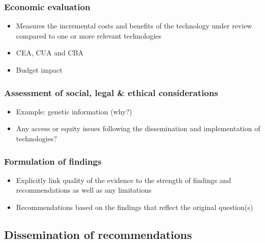 \documentclass[
]{book}
\providecommand{\tightlist}{%
  \setlength{\itemsep}{0pt}\setlength{\parskip}{0pt}}
\begin{document}
\hypertarget{economic-evaluation}{%
\subsubsection{Economic evaluation}\label{economic-evaluation}}

\begin{itemize}
\tightlist
\item
  Measures the incremental costs and benefits of the technology under review compared to one or more relevant technologies
\item
  CEA, CUA and CBA
\item
  Budget impact
\end{itemize}

\hypertarget{assessment-of-social-legal-ethical-considerations}{%
\subsubsection{Assessment of social, legal \& ethical considerations}\label{assessment-of-social-legal-ethical-considerations}}

\begin{itemize}
\tightlist
\item
  Example: genetic information (why?)
\item
  Any access or equity issues following the dissemination and implementation of technologies?
\end{itemize}

\hypertarget{formulation-of-findings}{%
\subsubsection{Formulation of findings}\label{formulation-of-findings}}

\begin{itemize}
\tightlist
\item
  Explicitly link quality of the evidence to the strength of findings and recommendations as well as any limitations
\item
  Recommendations based on the findings that reflect the original question(s)
\end{itemize}

\hypertarget{dissemination-of-recommendations}{%
\subsection{Dissemination of recommendations}\label{dissemination-of-recommendations}}
\end{document}
